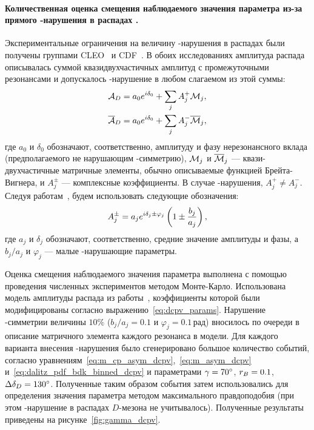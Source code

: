 \paragraph{\boldmath Количественная оценка смещения наблюдаемого значения параметра \gphi из-за прямого \cpconj-нарушения в распадах \dnkpp. }  Экспериментальные ограничения на величину \cpconj-нарушения в распадах \dkpp были получены группами CLEO~\cite{cleo_kspp_cpv} и CDF~\cite{cdf_kspp_cpv}.  В обоих исследованиях амплитуда распада \dnkpp описывалась суммой квазидвухчастичных амплитуд с промежуточными резонансами и допускалось \cpconj-нарушение в любом слагаемом из этой суммы:
\begin{equation}
\begin{split}
 \mathcal{A}_D    &= a_0e^{i\delta_0}+\sum\limits_j A_j^+\mathcal{M}_j, \\
 \overline{\mathcal{A}}_D &= a_0e^{i\delta_0}+\sum\limits_j A_j^-\overline{\mathcal{M}}_j,
\end{split}
\end{equation}
где $a_0$ и $\delta_0$ обозначают, соответственно, амплитуду и фазу нерезонансного вклада (предполагаемого не нарушающим \cpconj-симметрию), $\mathcal{M}_j$ и $\overline{\mathcal{M}}_j$ --- квази-двухчастичные матричные элементы, обычно описываемые функцией Брейта-Вигнера, и $A_j^{\pm}$ --- комплексные коэффициенты.  В случае \cpconj-нарушения, $A_j^+\neq A_j^-$.  Следуя работам~\cite{cleo_kspp_cpv,cdf_kspp_cpv}, будем использовать следующие обозначения:
\begin{equation}\label{eq:dcpv_params}
 A_{j}^{\pm} = a_je^{i\delta_j\pm\varphi_j}\left( 1 \pm \frac{b_j}{a_j}\right),
\end{equation}
где $a_j$ и $\delta_j$ обозначают, соответственно, средние значение амплитуды и фазы, а $b_j/a_j$ и $\varphi_j$ --- малые \cpconj-нарушающие параметры.

Оценка смещения наблюдаемого значения параметра \gphi выполнена с помощью проведения численных экспериментов методом Монте-Карло.  Использована модель амплитуды распада \dnkpp из работы~\cite{belle_gamma_dalitz_model}, коэффициенты которой были модифицированы согласно выражению~\eqref{eq:dcpv_params}.  Нарушение \cpconj-симметрии величины $10\%$ ($b_j/a_j=0.1$ и $\varphi_j=0.1\,\textrm{рад}$) вносилось по очереди в описание матричного элемента каждого резонанса в модели.  
Для каждого варианта внесения \cpconj-нарушения было сгенерировано большое количество событий, согласно уравнениям~\eqref{eq:m_cp_asym_dcpv},~\eqref{eq:m_asym_dcpv} и~\eqref{eq:dalitz_pdf_bdk_binned_dcpv} и параметрами $\gamma = 70^{\circ}$, $r_B=0.1$, $\Delta\delta_D = 130^{\circ}$.  Полученные таким образом события затем использовались для определения значения параметра \gphi методом максимального правдоподобия (при этом \cpconj-нарушение в распадах $D$-мезона не учитывалось).  Полученные результаты приведены на рисунке~\ref{fig:gamma_dcpv}.

